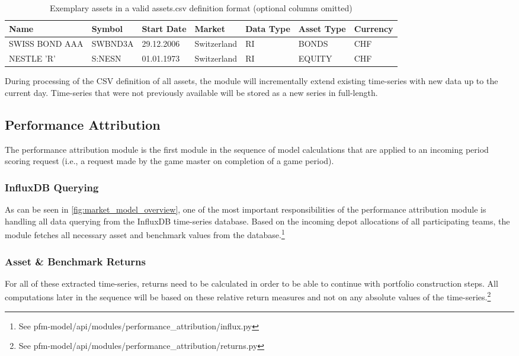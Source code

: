 \begin{table}[h!]
  \begin{tabular}{lllllll}
    \toprule
    Name & Symbol  & Start Date & Market      & Data Type & Asset Type & Currency \\
    \midrule
    SWISS BOND AAA & SWBND3A & 29.12.2006 & Switzerland & RI        & BONDS      & CHF      \\
    NESTLE 'R'     & S:NESN  & 01.01.1973 & Switzerland & RI        & EQUITY     & CHF      \\
    \bottomrule
  \end{tabular}
  \centering
  \caption{Exemplary assets in a valid assets.csv definition format (optional columns omitted)}
  \label{table:assets_csv}
\end{table}

During processing of the CSV definition of all assets, the module will incrementally extend existing time-series with new data up to the current day. Time-series that were not previously available will be stored as a new series in full-length.


\subsection{Performance Attribution}
The performance attribution module is the first module in the sequence of model calculations that are applied to an incoming period scoring request (i.e., a request made by the game master on completion of a game period).

\subsubsection{InfluxDB Querying}
As can be seen in \ref{fig:market_model_overview}, one of the most important responsibilities of the performance attribution module is handling all data querying from the InfluxDB time-series database. Based on the incoming depot allocations of all participating teams, the module fetches all necessary asset and benchmark values from the database.\footnote{See pfm-model/api/modules/performance\_attribution/influx.py}

\subsubsection{Asset \& Benchmark Returns}
For all of these extracted time-series, returns need to be calculated in order to be able to continue with portfolio construction steps. All computations later in the sequence will be based on these relative return measures and not on any absolute values of the time-series.\footnote{See pfm-model/api/modules/performance\_attribution/returns.py}

